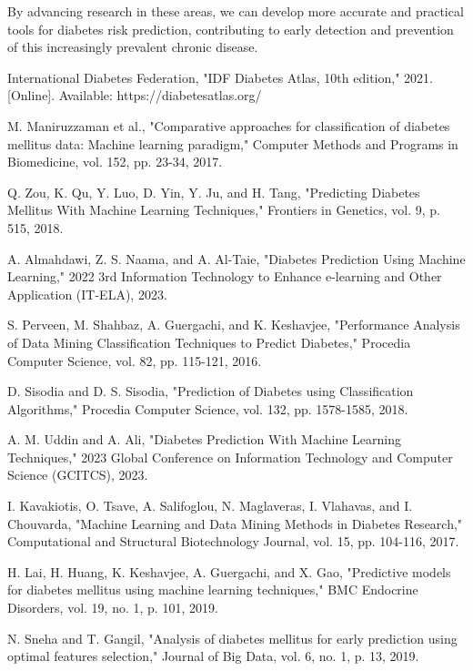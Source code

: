 \documentclass[conference]{IEEEtran}
\begin{document}
By advancing research in these areas, we can develop more accurate and practical tools for diabetes risk prediction, contributing to early detection and prevention of this increasingly prevalent chronic disease.

\begin{thebibliography}{00}
 International Diabetes Federation, "IDF Diabetes Atlas, 10th edition," 2021. [Online]. Available: https://diabetesatlas.org/

 M. Maniruzzaman et al., "Comparative approaches for classification of diabetes mellitus data: Machine learning paradigm," Computer Methods and Programs in Biomedicine, vol. 152, pp. 23-34, 2017.

 Q. Zou, K. Qu, Y. Luo, D. Yin, Y. Ju, and H. Tang, "Predicting Diabetes Mellitus With Machine Learning Techniques," Frontiers in Genetics, vol. 9, p. 515, 2018.

 A. Almahdawi, Z. S. Naama, and A. Al-Taie, "Diabetes Prediction Using Machine Learning," 2022 3rd Information Technology to Enhance e-learning and Other Application (IT-ELA), 2023.

 S. Perveen, M. Shahbaz, A. Guergachi, and K. Keshavjee, "Performance Analysis of Data Mining Classification Techniques to Predict Diabetes," Procedia Computer Science, vol. 82, pp. 115-121, 2016.

 D. Sisodia and D. S. Sisodia, "Prediction of Diabetes using Classification Algorithms," Procedia Computer Science, vol. 132, pp. 1578-1585, 2018.

 A. M. Uddin and A. Ali, "Diabetes Prediction With Machine Learning Techniques," 2023 Global Conference on Information Technology and Computer Science (GCITCS), 2023.

 I. Kavakiotis, O. Tsave, A. Salifoglou, N. Maglaveras, I. Vlahavas, and I. Chouvarda, "Machine Learning and Data Mining Methods in Diabetes Research," Computational and Structural Biotechnology Journal, vol. 15, pp. 104-116, 2017.

 H. Lai, H. Huang, K. Keshavjee, A. Guergachi, and X. Gao, "Predictive models for diabetes mellitus using machine learning techniques," BMC Endocrine Disorders, vol. 19, no. 1, p. 101, 2019.

 N. Sneha and T. Gangil, "Analysis of diabetes mellitus for early prediction using optimal features selection," Journal of Big Data, vol. 6, no. 1, p. 13, 2019.


\end{thebibliography}
\end{document}

